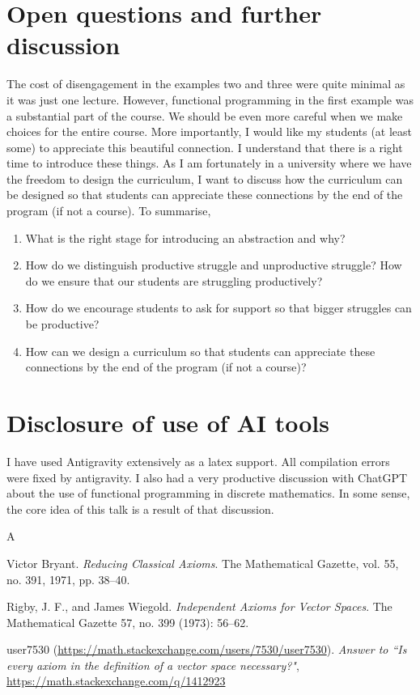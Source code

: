 \documentclass[12pt]{amsart}
\begin{document}
\section{Open questions and further discussion}

The cost of disengagement in the examples two and three were quite minimal as it was just one lecture.  However, functional programming in the first example was a substantial part of the course.  We should be even more careful when we make choices for the entire course.  More importantly, I would like my students (at least some) to appreciate this beautiful connection.  I understand that there is a right time to introduce these things.  As I am fortunately in a university where we have the freedom to design the curriculum, I want to discuss how the curriculum can be designed so that students can appreciate these connections by the end of the program (if not a course).  To summarise, 

\begin{enumerate}
    \item What is the right stage for introducing an abstraction and why?
    \item How do we distinguish productive struggle and unproductive struggle?  How do we ensure that our students are struggling productively?
    \item How do we encourage students to ask for support so that bigger struggles can be productive?
    \item How can we design a curriculum so that students can appreciate these connections by the end of the program (if not a course)?
\end{enumerate}

\section*{Disclosure of use of AI tools}
I have used Antigravity extensively as a latex support.  All compilation errors were fixed by antigravity.  I also had a very productive discussion with ChatGPT about the use of functional programming in discrete mathematics.  In some sense, the core idea of this talk is a result of that discussion.  


\begin{thebibliography}{A}

 Victor Bryant. \textit{Reducing Classical Axioms}. The Mathematical Gazette, vol. 55, no. 391, 1971, pp. 38–40.

 Rigby, J. F., and James Wiegold. \textit{Independent Axioms for Vector Spaces}. The Mathematical Gazette 57, no. 399 (1973): 56–62.

 user7530 (\url{https://math.stackexchange.com/users/7530/user7530}). \textit{Answer to ``Is every axiom in the definition of a vector space necessary?"}, \url{https://math.stackexchange.com/q/1412923}

\end{thebibliography}
\end{document}
